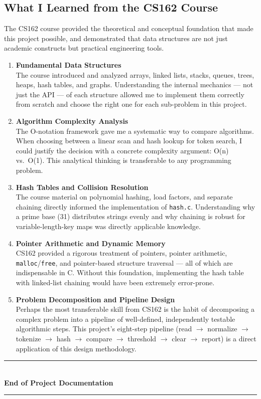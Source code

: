 \documentclass[12pt,a4paper]{article}
\begin{document}
\subsection{What I Learned from the CS162 Course}

The CS162 course provided the theoretical and conceptual foundation that made this project possible, and demonstrated that data structures are not just academic constructs but practical engineering tools.

\begin{enumerate}[leftmargin=1.8cm, label=\textbf{\arabic*.}, itemsep=8pt]

  \item \textbf{Fundamental Data Structures}\\
  The course introduced and analyzed arrays, linked lists, stacks, queues, trees, heaps, hash tables, and graphs. Understanding the internal mechanics — not just the API — of each structure allowed me to implement them correctly from scratch and choose the right one for each sub-problem in this project.

  \item \textbf{Algorithm Complexity Analysis}\\
  The O-notation framework gave me a systematic way to compare algorithms. When choosing between a linear scan and hash lookup for token search, I could justify the decision with a concrete complexity argument: O(n) vs.\ O(1). This analytical thinking is transferable to any programming problem.

  \item \textbf{Hash Tables and Collision Resolution}\\
  The course material on polynomial hashing, load factors, and separate chaining directly informed the implementation of \texttt{hash.c}. Understanding why a prime base (31) distributes strings evenly and why chaining is robust for variable-length-key maps was directly applicable knowledge.

  \item \textbf{Pointer Arithmetic and Dynamic Memory}\\
  CS162 provided a rigorous treatment of pointers, pointer arithmetic, \texttt{malloc}/\texttt{free}, and pointer-based structure traversal — all of which are indispensable in C. Without this foundation, implementing the hash table with linked-list chaining would have been extremely error-prone.

  \item \textbf{Problem Decomposition and Pipeline Design}\\
  Perhaps the most transferable skill from CS162 is the habit of decomposing a complex problem into a pipeline of well-defined, independently testable algorithmic steps. This project's eight-step pipeline (read $\to$ normalize $\to$ tokenize $\to$ hash $\to$ compare $\to$ threshold $\to$ clear $\to$ report) is a direct application of this design methodology.

\end{enumerate}

\vspace{1.2cm}
\begin{center}
  \color{accentblue}\rule{0.65\textwidth}{1pt}\\[0.4cm]
  {\large\bfseries\color{primaryblue} End of Project Documentation}\\[0.2cm]
  \color{accentblue}\rule{0.65\textwidth}{1pt}
\end{center}
\end{document}
